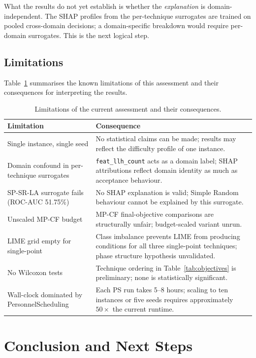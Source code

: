 \documentclass[11pt,a4paper]{article}
\begin{document}
What the results do not yet establish is whether the \emph{explanation} is
domain-independent. The SHAP profiles from the per-technique surrogates are trained
on pooled cross-domain decisions; a domain-specific breakdown would require per-domain
surrogates. This is the next logical step.

\subsection{Limitations}

Table~\ref{tab:limitations} summarises the known limitations of this assessment and their consequences for interpreting the results.

\begin{table}[H]
\centering
\begin{tabular}{p{5.5cm}p{8.5cm}}
\toprule
Limitation & Consequence \\
\midrule
Single instance, single seed & No statistical claims can be made; results may reflect
the difficulty profile of one instance. \\
Domain confound in per-technique surrogates & \texttt{feat\_llh\_count} acts as a domain
label; SHAP attributions reflect domain identity as much as acceptance behaviour. \\
SP-SR-LA surrogate fails (ROC-AUC 51.75\%) & No SHAP explanation is valid; Simple
Random behaviour cannot be explained by this surrogate. \\
Unscaled MP-CF budget & MP-CF final-objective comparisons are structurally unfair;
budget-scaled variant unrun. \\
LIME grid empty for single-point & Class imbalance prevents LIME from producing conditions
for all three single-point techniques; phase structure hypothesis unvalidated. \\
No Wilcoxon tests & Technique ordering in Table~\ref{tab:objectives} is preliminary;
none is statistically significant. \\
Wall-clock dominated by PersonnelScheduling & Each PS run takes 5--8 hours; scaling to
ten instances or five seeds requires approximately $50\times$ the current runtime. \\
\bottomrule
\end{tabular}
\caption{Limitations of the current assessment and their consequences.}
\label{tab:limitations}
\end{table}

\section{Conclusion and Next Steps}
\end{document}
